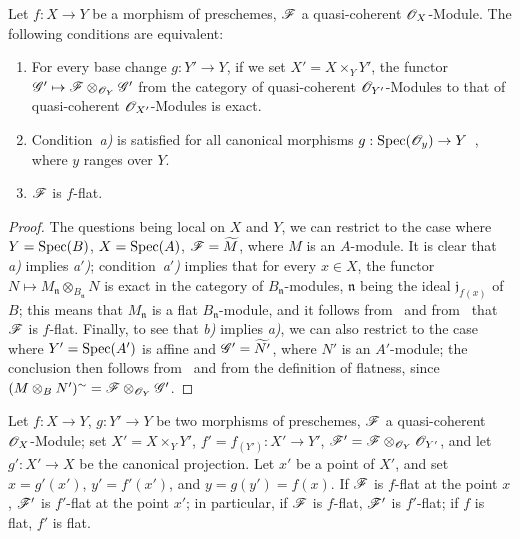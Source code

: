 \begin{proposition}[2.1.3]
\label{IV.2.1.3}
Let $f:X\to Y$ be a morphism of preschemes, $\mathscr{F}$ a quasi-coherent $\mathscr{O}_X$-Module. The following conditions are equivalent:
\begin{enumerate}
  \item[\emph{a)}] For every base change $g:Y'\to Y$, if we set $X'=X\times_Y Y'$, the functor $\mathscr{G}'\mapsto\mathscr{F}\otimes_{\mathscr{O}_Y}\mathscr{G}'$ from the category of quasi-coherent $\mathscr{O}_{Y'}$-Modules to that of quasi-coherent $\mathscr{O}_{X'}$-Modules is exact.
  \item[\emph{a$'$)}] Condition~\emph{a)} is satisfied for all canonical morphisms $g:\operatorname{Spec}(\mathscr{O}_y)\to Y$~, where $y$ ranges over $Y$.
  \item[\emph{b)}] $\mathscr{F}$ is $f$-flat.
\end{enumerate}
\end{proposition}

\begin{proof}
The questions being local on $X$ and $Y$, we can restrict to the case where $Y=\operatorname{Spec}(B)$, $X=\operatorname{Spec}(A)$, $\mathscr{F}=\widetilde{M}$, where $M$ is an $A$-module.
It is clear that \emph{a)} implies \emph{a$'$)};
condition~\emph{a$'$)} implies that for every $x\in X$, the functor $N\mapsto M_\mathfrak{n}\otimes_{B_\mathfrak{n}}N$ is exact in the category of $B_\mathfrak{n}$-modules, $\mathfrak{n}$ being the ideal $\mathfrak{j}_{f(x)}$ of $B$; this means that $M_\mathfrak{n}$ is a flat $B_\mathfrak{n}$-module, and it follows from~ and from~ that $\mathscr{F}$ is $f$-flat.
Finally, to see that \emph{b)} implies \emph{a)}, we can also restrict to the case where $Y'=\operatorname{Spec}(A')$ is affine and $\mathscr{G}'=\widetilde{N'}$, where $N'$ is an $A'$-module; the conclusion then follows from~ and from the definition of flatness, since $(M\otimes_B N')^{\sim}=\mathscr{F}\otimes_{\mathscr{O}_Y}\mathscr{G}'$.
\end{proof}

\begin{proposition}[2.1.4]
\label{IV.2.1.4}
Let $f:X\to Y$, $g:Y'\to Y$ be two morphisms of preschemes, $\mathscr{F}$ a quasi-coherent $\mathscr{O}_X$-Module; set $X'=X\times_Y Y'$, $f'=f_{(Y')}:X'\to Y'$, $\mathscr{F}'=\mathscr{F}\otimes_{\mathscr{O}_Y}\mathscr{O}_{Y'}$, and let $g':X'\to X$ be the canonical projection.
Let $x'$ be a point of $X'$, and set $x=g'(x')$, $y'=f'(x')$, and $y=g(y')=f(x)$.
If $\mathscr{F}$ is $f$-flat at the point $x$, $\mathscr{F}'$ is $f'$-flat at the point $x'$; in particular, if $\mathscr{F}$ is $f$-flat, $\mathscr{F}'$ is $f'$-flat; if $f$ is flat, $f'$ is flat.
\end{proposition}

